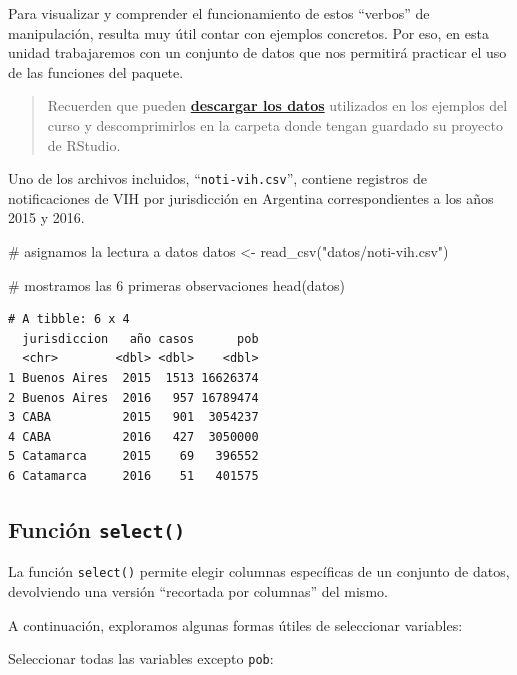 \documentclass[
  spanish,
  letterpaper,
  DIV=11,
  numbers=noendperiod]{scrreprt}
\newenvironment{Shaded}{\begin{snugshade}}{\end{snugshade}}
\newcommand{\CommentTok}[1]{\textcolor[rgb]{0.37,0.37,0.37}{#1}}
\newcommand{\FunctionTok}[1]{\textcolor[rgb]{0.28,0.35,0.67}{#1}}
\newcommand{\NormalTok}[1]{\textcolor[rgb]{0.00,0.23,0.31}{#1}}
\newcommand{\OtherTok}[1]{\textcolor[rgb]{0.00,0.23,0.31}{#1}}
\newcommand{\StringTok}[1]{\textcolor[rgb]{0.13,0.47,0.30}{#1}}
\begin{document}
Para visualizar y comprender el funcionamiento de estos ``verbos'' de
manipulación, resulta muy útil contar con ejemplos concretos. Por eso,
en esta unidad trabajaremos con un conjunto de datos que nos permitirá
practicar el uso de las funciones del paquete.

\begin{quote}
Recuerden que pueden
\href{../files/datos_y_paquetes.zip}{\textbf{descargar los datos}}
utilizados en los ejemplos del curso y descomprimirlos en la carpeta
donde tengan guardado su proyecto de RStudio.
\end{quote}

Uno de los archivos incluidos, ``\texttt{noti-vih.csv}'', contiene
registros de notificaciones de VIH por jurisdicción en Argentina
correspondientes a los años 2015 y 2016.

\begin{Shaded}
\begin{Highlighting}[]
\CommentTok{\# asignamos la lectura a datos}
\NormalTok{datos }\OtherTok{\textless{}{-}} \FunctionTok{read\_csv}\NormalTok{(}\StringTok{"datos/noti{-}vih.csv"}\NormalTok{)}

\CommentTok{\# mostramos las 6 primeras observaciones}
\FunctionTok{head}\NormalTok{(datos)}
\end{Highlighting}
\end{Shaded}

\begin{verbatim}
# A tibble: 6 x 4
  jurisdiccion   año casos      pob
  <chr>        <dbl> <dbl>    <dbl>
1 Buenos Aires  2015  1513 16626374
2 Buenos Aires  2016   957 16789474
3 CABA          2015   901  3054237
4 CABA          2016   427  3050000
5 Catamarca     2015    69   396552
6 Catamarca     2016    51   401575
\end{verbatim}

\subsection{\texorpdfstring{Función
\texttt{select()}}{Función select()}}\label{funciuxf3n-select}

La función \texttt{select()} permite elegir columnas específicas de un
conjunto de datos, devolviendo una versión ``recortada por columnas''
del mismo.

A continuación, exploramos algunas formas útiles de seleccionar
variables:

Seleccionar todas las variables excepto \texttt{pob}:
\end{document}
